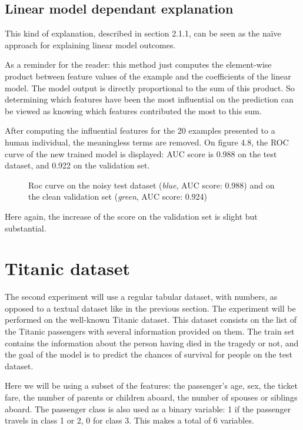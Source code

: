 \documentclass[a4paper,11pt]{kth-mag}
\begin{document}
\subsection{Linear model dependant explanation}

This kind of explanation, described in section 2.1.1, can be seen as the naïve approach for explaining linear model outcomes. 

As a reminder for the reader: this method just computes the element-wise product between feature values of the example and the coefficients of the linear model. The model output is directly proportional to the sum of this product. So determining which features have been the most influential on the prediction can be viewed as knowing which features contributed the most to this sum.

After computing the influential features for the 20 examples presented to a human individual, the meaningless terms are removed. On figure 4.8, the ROC curve of the new trained model is displayed: AUC score is 0.988 on the test dataset, and 0.922 on the validation set.

\begin{figure}[h!]
		\centering
    	\def\svgwidth{\columnwidth}
    	\resizebox{0.6\textwidth}{!}{}
    	\caption{Roc curve on the noisy test dataset (\textit{blue}, AUC score: 0.988) and on the clean validation set (\textit{green}, AUC score: 0.924)}
\end{figure}

Here again, the increase of the score on the validation set is slight but substantial.

\section{Titanic dataset}

The second experiment will use a regular tabular dataset, with numbers, as opposed to a textual dataset like in the previous section. The experiment will be performed on the well-known Titanic dataset. This dataset consists on the list of the Titanic passengers with several information provided on them. The train set contains the information about the person having died in the tragedy or not, and the goal of the model is to predict the chances of survival for people on the test dataset.

Here we will be using a subset of the features: the passenger's age, sex, the ticket fare, the number of parents or children aboard, the number of spouses or siblings aboard. The passenger class is also used as a binary variable: 1 if the passenger travels in class 1 or 2, 0 for class 3. This makes a total of 6 variables.
\end{document}
